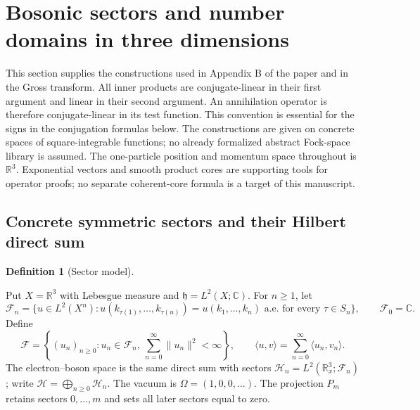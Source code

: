 \documentclass[11pt,a4paper]{article}
\theoremstyle{definition}
\newtheorem{definition}[theorem]{Definition}
\theoremstyle{remark}
\newcommand{\proofid}[1]{\par\smallskip{\normalfont\scriptsize\color{inkblue}Stable ID: \nolinkurl{#1}}\par\smallskip}
\begin{document}
\section{Bosonic sectors and number domains in three dimensions}
\label{sec:fock}

This section supplies the constructions used in Appendix B of the paper and
in the Gross transform. All inner products are conjugate-linear in their first
argument and linear in their second argument. An annihilation operator is
therefore conjugate-linear in its test function. This convention is essential
for the signs in the conjugation formulas below. The constructions are given
on concrete spaces of square-integrable functions; no already formalized
abstract Fock-space library is assumed. The one-particle position and
momentum space throughout is $\mathbb R^3$. Exponential vectors and
smooth product cores are supporting tools for operator proofs; no separate
coherent-core formula is a target of this manuscript.

\subsection{Concrete symmetric sectors and their Hilbert direct sum}

\begin{definition}[Sector model]\label{fock:sectors}
\proofid{fock:sectors}
\par{}\par\smallskip

Put $X=\mathbb R^3$ with Lebesgue measure and
$\mathfrak h=L^2(X;\mathbb C)$. For $n\geq1$, let
\[
 \mathcal F_n=\{u\in L^2(X^n):u(k_{\tau(1)},\ldots,k_{\tau(n)})
     =u(k_1,\ldots,k_n)\text{ a.e. for every }\tau\in S_n\},
 \qquad \mathcal F_0=\mathbb C.
\]
Define
\[
 \mathcal F=\left\{(u_n)_{n\geq0}:u_n\in\mathcal F_n,
                   \ \sum_{n=0}^{\infty}\|u_n\|^2<\infty\right\},
 \qquad
 \langle u,v\rangle=\sum_{n=0}^{\infty}\langle u_n,v_n\rangle.
\]
The electron--boson space is the same direct sum with sectors
$\mathcal H_n=L^2(\mathbb R^3_x;\mathcal F_n)$; write
$\mathcal H=\bigoplus_{n\geq0}\mathcal H_n$.
The vacuum is $\Omega=(1,0,0,\ldots)$. The projection $P_m$ retains
sectors $0,\ldots,m$ and sets all later sectors equal to zero.
\end{definition}
\end{document}
